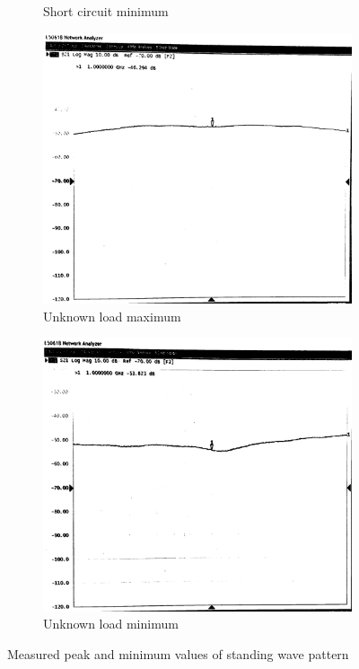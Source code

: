 \documentclass[10pt]{article}
\begin{document}
\begin{figure}[ht]
\begin{subfigure}[b]{0.45\textwidth}
        \caption{Short circuit minimum}
    \end{subfigure}
    \begin{subfigure}[b]{0.45\textwidth}
        \includegraphics[width=\textwidth]{../photos/lab2/unkwn-load-peak.jpg}
        \caption{Unknown load maximum}
    \end{subfigure}
    \quad
    \begin{subfigure}[b]{0.45\textwidth}
        \includegraphics[width=\textwidth]{../photos/lab2/unkwn-load-valley.jpg}
        \caption{Unknown load minimum}
    \end{subfigure}
    \caption{Measured peak and minimum values of standing wave pattern \vspace{-0.5cm}}
    \label{v_t_matched_tline}
\end{figure}
\end{document}
